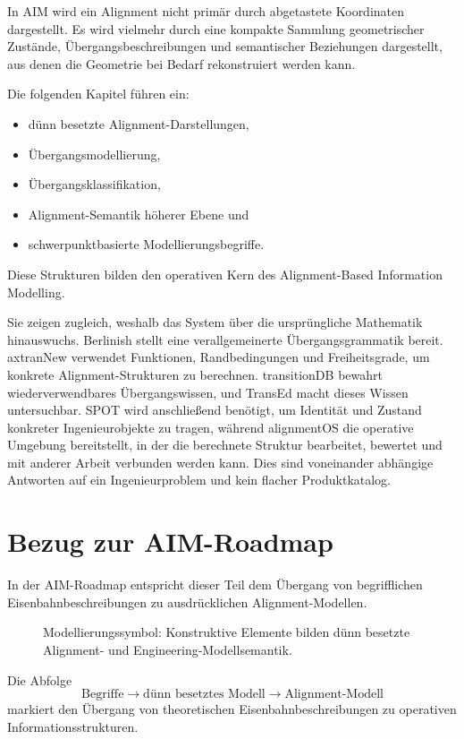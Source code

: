 In AIM wird ein Alignment nicht primär durch abgetastete Koordinaten
dargestellt. Es wird vielmehr durch eine kompakte Sammlung geometrischer
Zustände, Übergangsbeschreibungen und semantischer Beziehungen dargestellt,
aus denen die Geometrie bei Bedarf rekonstruiert werden kann.

Die folgenden Kapitel führen ein:
\begin{itemize}
\item dünn besetzte Alignment-Darstellungen,
\item Übergangsmodellierung,
\item Übergangsklassifikation,
\item Alignment-Semantik höherer Ebene und
\item schwerpunktbasierte Modellierungsbegriffe.
\end{itemize}

Diese Strukturen bilden den operativen Kern des Alignment-Based Information
Modelling.

Sie zeigen zugleich, weshalb das System über die ursprüngliche Mathematik
hinauswuchs. Berlinish stellt eine verallgemeinerte Übergangsgrammatik bereit.
axtranNew verwendet Funktionen, Randbedingungen und Freiheitsgrade, um
konkrete Alignment-Strukturen zu berechnen. transitionDB bewahrt
wiederverwendbares Übergangswissen, und TransEd macht dieses Wissen
untersuchbar. SPOT wird anschließend benötigt, um Identität und Zustand
konkreter Ingenieurobjekte zu tragen, während alignmentOS die operative
Umgebung bereitstellt, in der die berechnete Struktur bearbeitet, bewertet und
mit anderer Arbeit verbunden werden kann. Dies sind voneinander abhängige
Antworten auf ein Ingenieurproblem und kein flacher Produktkatalog.

\section*{Bezug zur AIM-Roadmap}

In der AIM-Roadmap entspricht dieser Teil dem Übergang von begrifflichen
Eisenbahnbeschreibungen zu ausdrücklichen Alignment-Modellen.

\begin{figure}[ht]
\centering

\caption{Modellierungssymbol: Konstruktive Elemente bilden dünn besetzte Alignment- und Engineering-Modellsemantik.}
\label{fig:icon-modeling-constructive-sparse}
\end{figure}

Die Abfolge
\[
\text{Begriffe}
\rightarrow
\text{dünn besetztes Modell}
\rightarrow
\text{Alignment-Modell}
\]
markiert den Übergang von theoretischen Eisenbahnbeschreibungen zu operativen
Informationsstrukturen.

